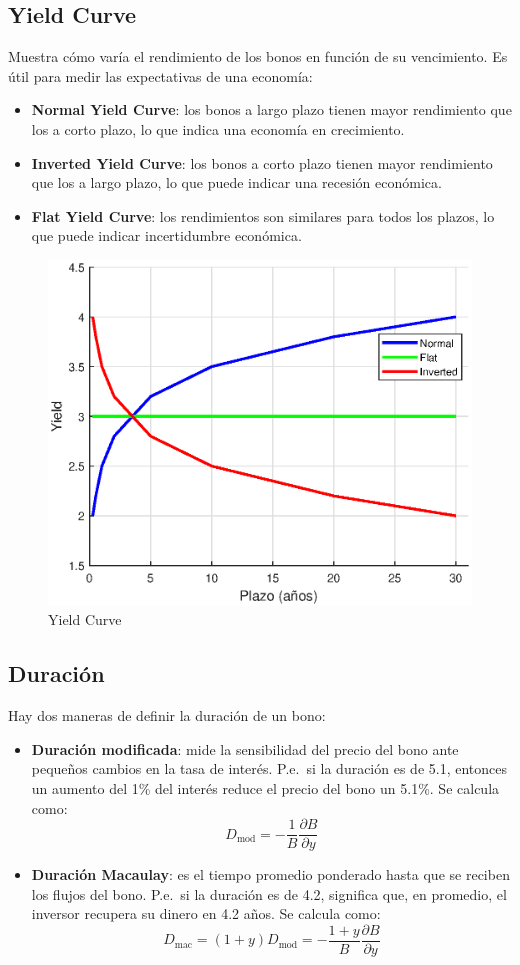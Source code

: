 \subsection{Yield Curve}
Muestra cómo varía el rendimiento de los bonos en función de su vencimiento. Es útil para medir las expectativas de una economía:
\begin{itemize}
    \item \textbf{Normal Yield Curve}: los bonos a largo plazo tienen mayor rendimiento que los a corto plazo, lo que indica una economía en crecimiento.
    \item \textbf{Inverted Yield Curve}: los bonos a corto plazo tienen mayor rendimiento que los a largo plazo, lo que puede indicar una recesión económica.
    \item \textbf{Flat Yield Curve}: los rendimientos son similares para todos los plazos, lo que puede indicar incertidumbre económica.
\end{itemize}
\begin{figure}[H]
    \centering
    \includegraphics[width=0.65\linewidth]{Imagenes/Parte1/11_Prods_renta_fija/Yield_Curve.eps}
    \caption{Yield Curve}
\end{figure}




\subsection{Duración}
Hay dos maneras de definir la duración de un bono:
\begin{itemize}
    \item \textbf{Duración modificada}: mide la sensibilidad del precio del bono ante pequeños cambios en la tasa de interés. P.e.\ si la duración es de 5.1, entonces un aumento  del 1\% del interés reduce el precio del bono un 5.1\%. Se calcula como:
    \[
        \boxed{D_{\text{mod}} =  -\frac{1}{B}\frac{\partial B}{\partial y}}
    \]
    \item \textbf{Duración Macaulay}: es el tiempo promedio ponderado hasta que se reciben los flujos del bono. P.e.\ si la duración es de 4.2, significa que, en promedio, el inversor recupera su dinero en 4.2 años. Se calcula como:
    \[
        \boxed{D_{\text{mac}} = (1+y)D_{\text{mod}} = -\frac{1+y}{B}\frac{\partial B}{\partial y}}
    \]
\end{itemize}

